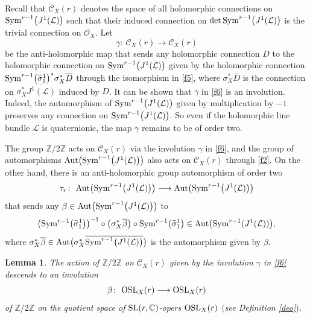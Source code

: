 \documentclass[pdftex]{sigma}
\numberwithin{equation}{section}
\newtheorem{Lemma}[Theorem]{Lemma}
\begin{document}
Recall that ${\mathcal C}_X(r)$ denotes the space of all holomorphic connections on ${\rm
Sym}^{r-1}\bigl(J^1(\mathcal L)\bigr)$ such that their induced connection on $\det {\rm Sym}^{r-1}\bigl(J^1(\mathcal
L)\bigr)$ is the trivial connection on ${\mathcal O}_X$. Let
\begin{equation}\label{f6}
\gamma\colon\ {\mathcal C}_X(r) \longrightarrow {\mathcal C}_X(r)
\end{equation}
be the anti-holomorphic map that sends any holomorphic connection $D$ to the
holomorphic connection on ${\rm
Sym}^{r-1}\bigl(J^1(\mathcal L)\bigr)$ given by the holomorphic connection ${\rm
Sym}^{r-1}\bigl(\widehat{\sigma}^1_1\bigr)^*\sigma^*_X\overline{D}$ through the
isomorphism in \eqref{f5}, where $\sigma^*_X\overline{D}$ is the connection on
$\sigma^*_X\overline{J^1(\mathcal L)}$ induced by $D$. It can be shown that $\gamma$ in \eqref{f6} is an
involution. Indeed, the automorphism of ${\rm Sym}^{r-1}\bigl(J^1(\mathcal L)\bigr)$ given by multiplication by $-1$ preserves any
connection on ${\rm Sym}^{r-1}\bigl(J^1(\mathcal L)\bigr)$. So even if the holomorphic line bundle
$\mathcal L$ is quaternionic, the map $\gamma$ remains to be of order two.

The group ${\mathbb Z}/2{\mathbb Z}$ acts on ${\mathcal C}_X(r)$ via the involution $\gamma$
in \eqref{f6}, and the group of automorphisms $\text{Aut}\bigl({\rm Sym}^{r-1}\bigl(J^1(\mathcal L)\bigr)\bigr)$ also acts on
${\mathcal C}_X(r)$ through \eqref{f2}. On the other hand, there is an anti-holomorphic group
automorphism of order two
\begin{gather}\label{f8}
\tau_r\colon\ \text{Aut}\bigl({\rm Sym}^{r-1}\bigl(J^1(\mathcal L)\bigr)\bigr) \longrightarrow
\text{Aut}\bigl({\rm Sym}^{r-1}\bigl(J^1(\mathcal L)\bigr)\bigr)
\end{gather}
that sends any $\beta \in \text{Aut}\bigl({\rm Sym}^{r-1}\bigl(J^1(\mathcal L)\bigr)\bigr)$ to
\[
\bigl({\rm Sym}^{r-1}\bigl(\widehat{\sigma}^1_1\bigr)\bigr)^{-1}\circ\bigl(\sigma^*_X\overline{\beta}\bigr)\circ
{\rm Sym}^{r-1}\bigl(\widehat{\sigma}^1_1\bigr) \in
\text{Aut}\bigl({\rm Sym}^{r-1}(J^1(\mathcal L))\bigr),
\]
where $\sigma^*_X\overline{\beta} \in \text{Aut}\bigl(\sigma^*_X\overline{{\rm Sym}^{r-1}
\bigl(J^1(\mathcal L)\bigr)}\bigr)$ is the automorphism given by $\beta$.

\begin{Lemma}\label{lem3}
The action of ${\mathbb Z}/2{\mathbb Z}$ on ${\mathcal C}_X(r)$ given by the involution $\gamma$
in \eqref{f6} descends to an involution
\begin{equation}\label{f7}
\beta\colon\ {\rm OSL}_X(r) \longrightarrow {\rm OSL}_X(r)
\end{equation}
of ${\mathbb Z}/2{\mathbb Z}$ on the quotient space of ${\rm SL}(r,\mathbb{C})$-opers
${\rm OSL}_X(r)$ $($see Definition {\rm \ref{deo}}$)$.
\end{Lemma}
\end{document}
